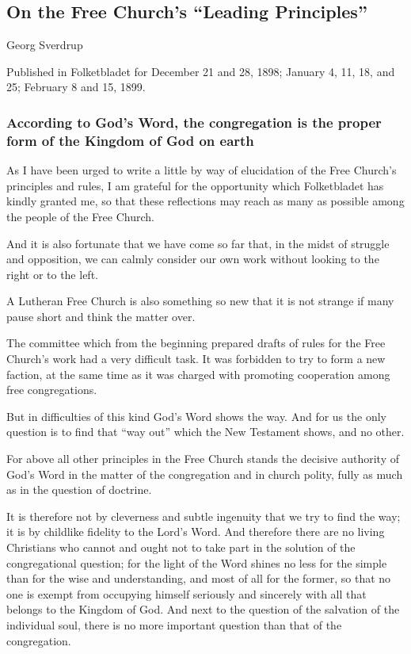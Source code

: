 
\subsection{On the Free Church’s “Leading Principles”}

Georg Sverdrup

Published in Folketbladet for December 21 and 28, 1898; January 4, 11, 18, and 25; February 8 and 15, 1899.

\subsubsection{According to God’s Word, the congregation is the proper form of the Kingdom of God on earth}

As I have been urged to write a little by way of elucidation of the Free Church’s principles and rules, I am grateful for the opportunity which Folketbladet has kindly granted me, so that these reflections may reach as many as possible among the people of the Free Church.

And it is also fortunate that we have come so far that, in the midst of struggle and opposition, we can calmly consider our own work without looking to the right or to the left.

A Lutheran Free Church is also something so new that it is not strange if many pause short and think the matter over.

The committee which from the beginning prepared drafts of rules for the Free Church’s work had a very difficult task. It was forbidden to try to form a new faction, at the same time as it was charged with promoting cooperation among free congregations.

But in difficulties of this kind God’s Word shows the way. And for us the only question is to find that “way out” which the New Testament shows, and no other.

For above all other principles in the Free Church stands the decisive authority of God’s Word in the matter of the congregation and in church polity, fully as much as in the question of doctrine.

It is therefore not by cleverness and subtle ingenuity that we try to find the way; it is by childlike fidelity to the Lord’s Word. And therefore there are no living Christians who cannot and ought not to take part in the solution of the congregational question; for the light of the Word shines no less for the simple than for the wise and understanding, and most of all for the former, so that no one is exempt from occupying himself seriously and sincerely with all that belongs to the Kingdom of God. And next to the question of the salvation of the individual soul, there is no more important question than that of the congregation.

